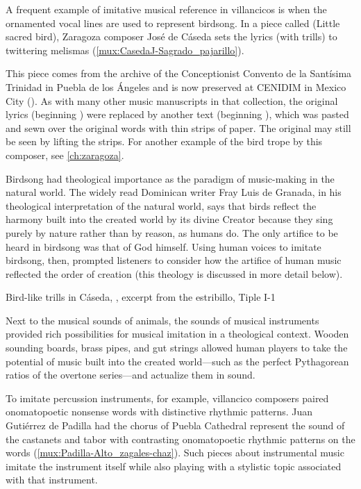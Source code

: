 A frequent example of imitative musical reference in villancicos is when the
ornamented vocal lines are used to represent birdsong.
In a piece called  (Little sacred bird), Zaragoza
composer José de Cáseda sets the lyrics  (with trills) to
twittering melismas (\cref{mux:CasedaJ-Sagrado_pajarillo}).%
\begin{Footnote} 
    This piece comes from the archive of the Conceptionist Convento de la
    Santísima Trinidad in Puebla de los Ángeles and is now preserved at CENIDIM
    in Mexico City ().
    As with many other music manuscripts in that collection, the original
    lyrics (beginning ) were replaced by another
    text (beginning ), which was pasted and sewn
    over the original words with thin strips of paper.  
    The original may still be seen by lifting the strips.
    For another example of the bird trope by this composer, see
    \cref{ch:zaragoza}.
\end{Footnote}
Birdsong had theological importance as the paradigm of music-making in the
natural world.
The widely read Dominican writer Fray Luis de Granada, in his theological
interpretation of the natural world, says that birds reflect the harmony built
into the created world by its divine Creator because they sing purely by nature
rather than by reason, as humans do.%
    \citXXX[luis]
The only artifice to be heard in birdsong was that of God himself.
Using human voices to imitate birdsong, then, prompted listeners to consider
how the artifice of human music reflected the order of creation (this theology
is discussed in more detail below). 

{Bird-like trills in Cáseda, , excerpt from the
estribillo, Tiple I-1}

Next to the musical sounds of animals, the sounds of musical instruments
provided rich possibilities for musical imitation in a theological context.
Wooden sounding boards, brass pipes, and gut strings allowed human players to
take the potential of music built into the created world---such as the perfect
Pythagorean ratios of the overtone series---and actualize them in sound.

To imitate percussion instruments, for example, villancico composers paired
onomatopoetic nonsense words with distinctive rhythmic patterns.
Juan Gutiérrez de Padilla had the chorus of Puebla Cathedral represent the
sound of the castanets and tabor with contrasting onomatopoetic rhythmic
patterns on the words  (\cref{mux:Padilla-Alto_zagales-chaz}).
Such pieces about instrumental music imitate the instrument itself while also
playing with a stylistic topic associated with that instrument.

